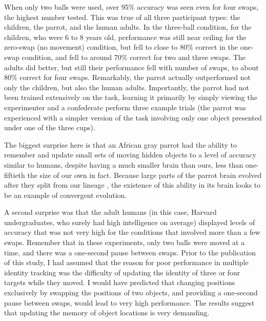 \documentclass[
]{book}
\begin{document}
When only two balls were used, over 95\% accuracy was seen even for four swaps, the highest number tested. This was true of all three participant types: the children, the parrot, and the human adults. In the three-ball condition, for the children, who were 6 to 8 years old, performance was still near ceiling for the zero-swap (no movement) condition, but fell to close to 80\% correct in the one-swap condition, and fell to around 70\% correct for two and three swaps. The adults did better, but still their performance fell with number of swaps, to about 80\% correct for four swaps. Remarkably, the parrot actually outperformed not only the children, but also the human adults. Importantly, the parrot had not been trained extensively on the task, learning it primarily by simply viewing the experimenter and a confederate perform three example trials (the parrot was experienced with a simpler version of the task involving only one object presented under one of the three cups).

The biggest surprise here is that an African gray parrot had the ability to remember and update small sets of moving hidden objects to a level of accuracy similar to humans, despite having a much smaller brain than ours, less than one-fiftieth the size of our own in fact. Because large parts of the parrot brain evolved after they split from our lineage \citep{iwaniukInterspecificAllometryBrain2005}, the existence of this ability in its brain looks to be an example of convergent evolution.

A second surprise was that the adult humans (in this case, Harvard undergraduates, who surely had high intelligence on average) displayed levels of accuracy that was not very high for the conditions that involved more than a few swaps. Remember that in these experiments, only two balls were moved at a time, and there was a one-second pause between swaps. Prior to the publication of this study, I had assumed that the reason for poor performance in multiple identity tracking was the difficulty of updating the identity of three or four targets while they moved. I would have predicted that changing positions exclusively by swapping the positions of two objects, and providing a one-second pause between swaps, would lead to very high performance. The \citet{pailianAgeSpeciesComparisons2020} results suggest that updating the memory of object locations is very demanding.
\end{document}
